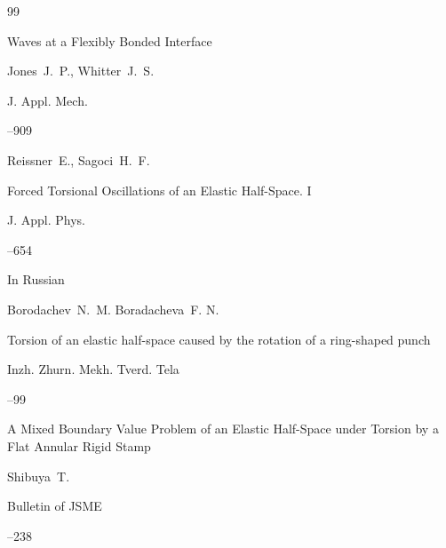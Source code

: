 \begin{thebibliography}{99}








\paper Waves at a Flexibly Bonded Interface

\by Jones~J.~P., Whitter~J.~S.

\jour  J. Appl. Mech.




--909 





\by Reissner~E., Sagoci~H.~F.

\paper Forced Torsional Oscillations of an Elastic Half-Space. I

\jour J. Appl. Phys.




--654





\lang In Russian

\by Borodachev~N.~M. Boradacheva~F. N.

\paper Torsion of an elastic half-space caused by the rotation of a ring-shaped punch

\jour Inzh. Zhurn. Mekh. Tverd. Tela



--99




\paper A Mixed Boundary Value Problem of an Elastic Half-Space under Torsion by a Flat Annular Rigid Stamp

\by Shibuya~T. 

\jour Bulletin of JSME




--238


\end{thebibliography}
